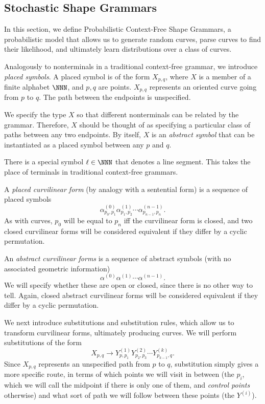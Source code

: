 
\subsection{Stochastic Shape Grammars}

In this section, we define Probabilistic Context-Free Shape Grammars,
a probabilistic model that allows us to generate random curves, parse
curves to find their likelihood, and ultimately learn distributions
over a class of curves.

Analogously to nonterminals in a traditional context-free grammar, we
introduce {\em placed symbols}. A placed symbol is of the form
$X_{p,q}$, where $X$ is a member of a finite alphabet $\NNN$, and
$p,q$ are points. $X_{p,q}$ represents an oriented curve going from
$p$ to $q$. The path between the endpoints is unspecified.

We specify the type $X$ so that different nonterminals can be related
by the grammar. Therefore, $X$ should be thought of as specifying a
particular class of paths between any two endpoints. By itself, $X$ is
an {\em abstract symbol} that can be instantiated as a placed symbol
between any $p$ and $q$.

There is a special symbol $\ell\in \NNN$ that denotes a line
segment. This takes the place of terminals in traditional context-free
grammars.

\begin{defn}
A {\em placed curvilinear form} (by analogy with a sentential form) is
a sequence of placed symbols
$$ \alpha^{(0)}_{p_0,p_1} \alpha^{(1)}_{p_1,p_2} \cdots
\alpha^{(n-1)}_{p_{n-1},{p_n}}.$$ As with curves, $p_0$ will be equal
to $p_n$ iff the curvilinear form is closed, and two closed curvilinear
forms will be considered equivalent if they differ by a cyclic
permutation.

An {\em abstract curvilinear forms} is a sequence of abstract symbols
(with no associated geometric information)
$$ \alpha^{(0)} \alpha^{(1)} \cdots \alpha^{(n-1)}.$$ We will specify
whether these are open or closed, since there is no other way to
tell. Again, closed abstract curvilinear forms will be considered
equivalent if they differ by a cyclic permutation.
\end{defn}

We next introduce substitutions and substitution rules, which allow us
to transform curvilinear forms, ultimately producing curves. We will
perform substitutions of the form
$$ X_{p,q} \to Y^{(1)}_{p,p_1} Y^{(2)}_{p_2,p_3} \cdots
Y^{(k)}_{p_{k-1},q}.$$ Since $X_{p,q}$ represents an unspecified path
from $p$ to $q$, substitution simply gives a more specific route, in
terms of which points we will visit in between (the $p_i$, which we
will call the midpoint if there is only one of them, and {\em control
  points} otherwise) and what sort of path we will follow between
these points (the $Y^{(i)}$).

